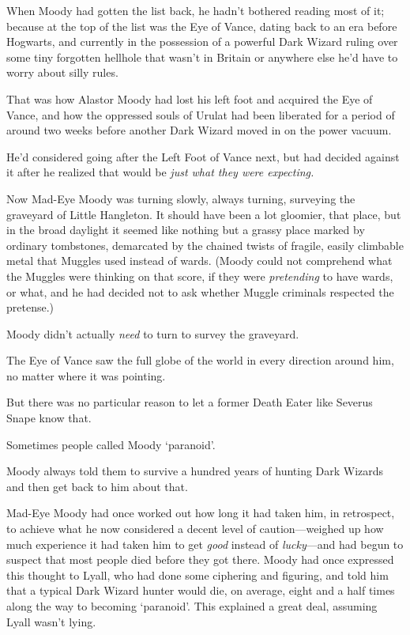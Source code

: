 When Moody had gotten the list back, he hadn't bothered reading most of it; 
because at the top of the list was the Eye of Vance, dating back to an era 
before Hogwarts, and currently in the possession of a powerful Dark Wizard 
ruling over some tiny forgotten hellhole that wasn't in Britain or anywhere 
else he'd have to worry about silly rules.

That was how Alastor Moody had lost his left foot and acquired the Eye of 
Vance, and how the oppressed souls of Urulat had been liberated for a period of 
around two weeks before another Dark Wizard moved in on the power vacuum.

He'd considered going after the Left Foot of Vance next, but had decided 
against it after he realized that would be \emph{just what they were expecting.}

Now Mad-Eye Moody was turning slowly, always turning, surveying the graveyard 
of Little Hangleton. It should have been a lot gloomier, that place, but in the 
broad daylight it seemed like nothing but a grassy place marked by ordinary 
tombstones, demarcated by the chained twists of fragile, easily climbable metal 
that Muggles used instead of wards. (Moody could not comprehend what the 
Muggles were thinking on that score, if they were \emph{pretending} to have 
wards, or what, and he had decided not to ask whether Muggle criminals 
respected the pretense.)

Moody didn't actually \emph{need} to turn to survey the graveyard.

The Eye of Vance saw the full globe of the world in every direction around him, 
no matter where it was pointing.

But there was no particular reason to let a former Death Eater like Severus 
Snape know that.

Sometimes people called Moody `paranoid'.

Moody always told them to survive a hundred years of hunting Dark Wizards and 
then get back to him about that.

Mad-Eye Moody had once worked out how long it had taken him, in retrospect, to 
achieve what he now considered a decent level of caution---weighed up how much 
experience it had taken him to get \emph{good} instead of \emph{lucky}---and 
had begun to suspect that most people died before they got there. Moody had 
once expressed this thought to Lyall, who had done some ciphering and figuring, 
and told him that a typical Dark Wizard hunter would die, on average, eight and 
a half times along the way to becoming `paranoid'. This explained a great deal, 
assuming Lyall wasn't lying.

